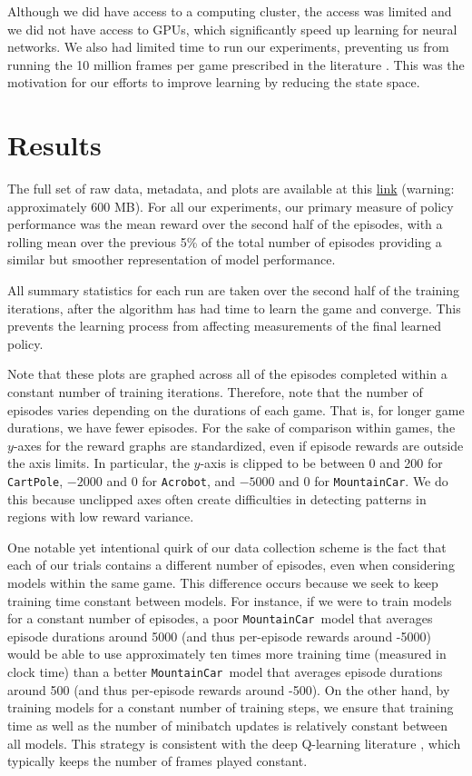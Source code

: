 \documentclass[11pt]{article}
\newcommand{\cp}{\texttt{CartPole}}
\newcommand{\ab}{\texttt{Acrobot}}
\newcommand{\mc}{\texttt{MountainCar}}
\begin{document}
Although we did have access to a computing cluster, the access was limited and we did not have access to GPUs, which significantly speed up learning for neural networks. We also had limited time to run our experiments, preventing us from running the 10 million frames per game prescribed in the literature \cite{mnih2013playing, mnih2015human}. This was the motivation for our efforts to improve learning by reducing the state space.

\section{Results}

The full set of raw data, metadata, and plots are available at this \href{https://github.com/hahakumquat/stat234-project/tree/master/data}{link} (warning: approximately 600 MB). For all our experiments, our primary measure of policy performance was the mean reward over the second half of the episodes, with a rolling mean over the previous 5\% of the total number of episodes providing a similar but smoother representation of model performance.

All summary statistics for each run are taken over the second half of the training iterations, after the algorithm has had time to learn the game and converge. This prevents the learning process from affecting measurements of the final learned policy.

Note that these plots are graphed across all of the episodes completed within a constant number of training iterations. Therefore, note that the number of episodes varies depending on the durations of each game. That is, for longer game durations, we have fewer episodes. For the sake of comparison within games, the $y$-axes for the reward graphs are standardized, even if episode rewards are outside the axis limits. In particular, the $y$-axis is clipped to be between 0 and 200 for \cp, $-2000$ and 0 for \ab, and $-5000$ and 0 for \mc. We do this because unclipped axes often create difficulties in detecting patterns in regions with low reward variance. 

One notable yet intentional quirk of our data collection scheme is the fact that each of our trials contains a different number of episodes, even when considering models within the same game. This difference occurs because we seek to keep training time constant between models. For instance, if we were to train models for a constant number of episodes, a poor \mc~model that averages episode durations around 5000 (and thus per-episode rewards around -5000) would be able to use approximately ten times more training time (measured in clock time) than a better \mc~model that averages episode durations around 500 (and thus per-episode rewards around -500). On the other hand, by training models for a constant number of training steps, we ensure that training time as well as the number of minibatch updates is relatively constant between all models. This strategy is consistent with the deep Q-learning literature \cite{mnih2013playing, mnih2015human, van2016deep}, which typically keeps the number of frames played constant.
\end{document}
